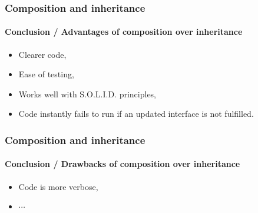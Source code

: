 \begin{frame}
    \frametitle{Composition and inheritance}
    \framesubtitle{Conclusion / Advantages of composition over inheritance}

    \begin{itemize}[<+->]
        \item Clearer code,
        \item Ease of testing,
        \item Works well with S.O.L.I.D. principles,
        \item Code instantly fails to run if an updated interface is not fulfilled.
    \end{itemize}
\end{frame}

\begin{frame}
    \frametitle{Composition and inheritance}
    \framesubtitle{Conclusion / Drawbacks of composition over inheritance}

    \begin{itemize}[<+->]
        \item Code is more verbose,
        \item $\cdots$
    \end{itemize}
\end{frame}
